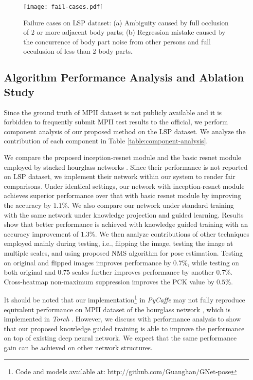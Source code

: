 \documentclass[journal ]{IEEEtran}
\begin{document}
\begin{figure*}[h]
	\begin{center}
		\texttt{[image: fail-cases.pdf]}
	\end{center}
	\caption{Failure cases on LSP dataset: (a) Ambiguity caused by full occlusion of 2 or more adjacent body parts; (b) Regression mistake caused by the concurrence of body part noise from other persons and full occulusion of less than 2 body parts. }
	\label{fig:fail-cases}
\end{figure*}


\subsection{Algorithm Performance Analysis and Ablation Study}
\label{sec:component-analysis}


Since the ground truth of MPII dataset is not publicly available and it is forbidden to frequently submit MPII test results to the official, we perform component analysis of our proposed method on the LSP dataset.
We analyze the contribution of each component in Table \ref{table:component-analysis}. 

We compare the proposed inception-resnet module and the basic resnet module employed by stacked hourglass networks \cite{newell2016stacked}. 
Since their performance is not reported on LSP dataset, we implement their network within our system to render fair comparisons.
Under identical settings, our network with inception-resnet module achieves superior performance over that with basic resnet module by improving the accuracy by $1.1$\%. 
We also compare our network under standard training with the same network under knowledge projection and guided learning. Results show that better performance is achieved with knowledge guided training with an accuracy improvement of $1.3$\%.
We then analyze contributions of other techniques employed mainly during testing, i.e., flipping the image, testing the image at multiple scales, and using proposed NMS algorithm for pose estimation. 
Testing on original and flipped images improves performance by 0.7\%, while testing on both original and $0.75$ scales further improves performance by another $0.7$\%. Cross-heatmap non-maximum suppression improves the PCK value by $0.5$\%.


It should be noted that our implementation\footnote{Code and models available at: http://github.com/Guanghan/GNet-pose}  in \textit{PyCaffe} \cite{jia2014caffe} may not fully reproduce equivalent performance on MPII dataset of the hourglass network \cite{newell2016stacked}, which is implemented in \textit{Torch} \cite{torch}. 
However, we discuss with performance analysis to show that our proposed knowledge guided training is able to improve the performance on top of existing deep neural network. We expect that the same performance gain can be achieved on other network structures. 
\end{document}
